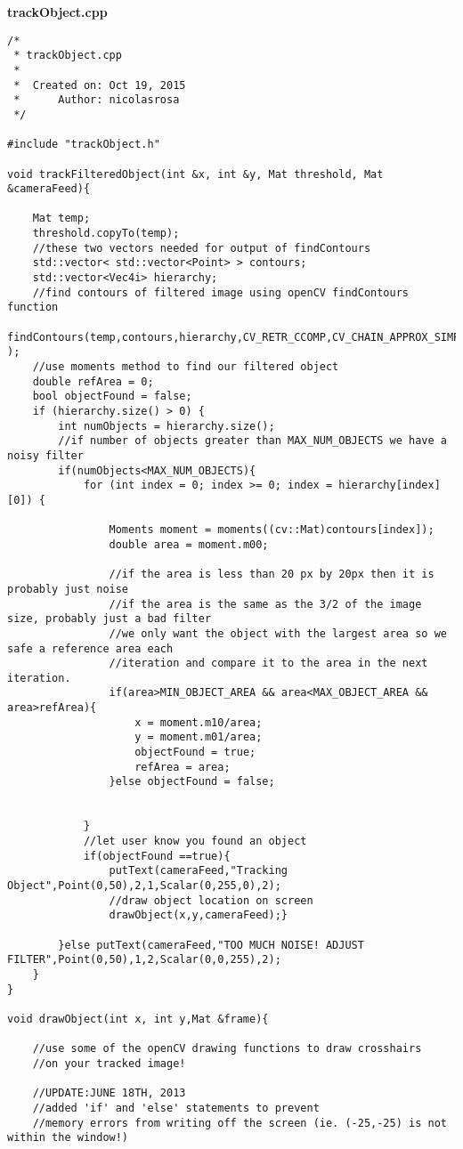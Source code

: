 \textbf{trackObject.cpp}
\begin{lstlisting}
/*
 * trackObject.cpp
 *
 *  Created on: Oct 19, 2015
 *      Author: nicolasrosa
 */

#include "trackObject.h"

void trackFilteredObject(int &x, int &y, Mat threshold, Mat &cameraFeed){

	Mat temp;
	threshold.copyTo(temp);
	//these two vectors needed for output of findContours
	std::vector< std::vector<Point> > contours;
	std::vector<Vec4i> hierarchy;
	//find contours of filtered image using openCV findContours function
	findContours(temp,contours,hierarchy,CV_RETR_CCOMP,CV_CHAIN_APPROX_SIMPLE );
	//use moments method to find our filtered object
	double refArea = 0;
	bool objectFound = false;
	if (hierarchy.size() > 0) {
		int numObjects = hierarchy.size();
        //if number of objects greater than MAX_NUM_OBJECTS we have a noisy filter
        if(numObjects<MAX_NUM_OBJECTS){
			for (int index = 0; index >= 0; index = hierarchy[index][0]) {

				Moments moment = moments((cv::Mat)contours[index]);
				double area = moment.m00;

				//if the area is less than 20 px by 20px then it is probably just noise
				//if the area is the same as the 3/2 of the image size, probably just a bad filter
				//we only want the object with the largest area so we safe a reference area each
				//iteration and compare it to the area in the next iteration.
                if(area>MIN_OBJECT_AREA && area<MAX_OBJECT_AREA && area>refArea){
					x = moment.m10/area;
					y = moment.m01/area;
					objectFound = true;
					refArea = area;
				}else objectFound = false;


			}
			//let user know you found an object
			if(objectFound ==true){
				putText(cameraFeed,"Tracking Object",Point(0,50),2,1,Scalar(0,255,0),2);
				//draw object location on screen
				drawObject(x,y,cameraFeed);}

		}else putText(cameraFeed,"TOO MUCH NOISE! ADJUST FILTER",Point(0,50),1,2,Scalar(0,0,255),2);
	}
}

void drawObject(int x, int y,Mat &frame){

	//use some of the openCV drawing functions to draw crosshairs
	//on your tracked image!

    //UPDATE:JUNE 18TH, 2013
    //added 'if' and 'else' statements to prevent
    //memory errors from writing off the screen (ie. (-25,-25) is not within the window!)


\end{lstlisting}
